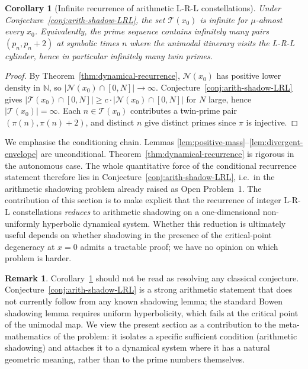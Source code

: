 \documentclass[11pt,a4paper]{article}
\newtheorem{corollary}{Corollary}
\theoremstyle{definition}
\newtheorem{remark}{Remark}
\begin{document}
\begin{corollary}[Infinite recurrence of arithmetic L-R-L constellations]
\label{cor:twin-conditional}
Under Conjecture~\ref{conj:arith-shadow-LRL}, the set
$\mathcal{T}(x_0)$ is infinite for $\mu$-almost every $x_0$.
Equivalently, the prime sequence contains infinitely many pairs
$(p_n, p_n + 2)$ at symbolic times $n$ where the unimodal itinerary
visits the L-R-L cylinder, hence in particular infinitely many twin
primes.
\end{corollary}
\begin{proof}
By Theorem~\ref{thm:dynamical-recurrence}, $\mathcal{N}(x_0)$ has
positive lower density in $\mathbb{N}$, so
$|\mathcal{N}(x_0) \cap [0, N]| \to \infty$. Conjecture~\ref{conj:arith-shadow-LRL}
gives $|\mathcal{T}(x_0) \cap [0, N]| \geq c \cdot |\mathcal{N}(x_0) \cap [0, N]|$
for $N$ large, hence $|\mathcal{T}(x_0)| = \infty$. Each $n \in \mathcal{T}(x_0)$
contributes a twin-prime pair $(\pi(n), \pi(n)+2)$, and distinct $n$
give distinct primes since $\pi$ is injective.
\end{proof}

We emphasise the conditioning chain. Lemmas
\ref{lem:positive-mass}--\ref{lem:divergent-envelope} are
unconditional. Theorem~\ref{thm:dynamical-recurrence} is rigorous
in the autonomous case. The whole quantitative force of the
conditional recurrence statement therefore lies in
Conjecture~\ref{conj:arith-shadow-LRL}, i.e.\ in the arithmetic
shadowing problem already raised as Open Problem~1. The contribution
of this section is to make explicit that the recurrence of integer
L-R-L constellations \emph{reduces} to arithmetic shadowing on a
one-dimensional non-uniformly hyperbolic dynamical system. Whether
this reduction is ultimately useful depends on whether shadowing in
the presence of the critical-point degeneracy at $x = 0$ admits a
tractable proof; we have no opinion on which problem is harder.

\begin{remark}
\label{rem:over-claim}
Corollary~\ref{cor:twin-conditional} should not be read as resolving
any classical conjecture. Conjecture~\ref{conj:arith-shadow-LRL} is a
strong arithmetic statement that does not currently follow from any
known shadowing lemma; the standard Bowen shadowing lemma requires
uniform hyperbolicity, which fails at the critical point of the
unimodal map. We view the present section as a contribution to the
meta-mathematics of the problem: it isolates a specific sufficient
condition (arithmetic shadowing) and attaches it to a dynamical
system where it has a natural geometric meaning, rather than to the
prime numbers themselves.
\end{remark}
\end{document}
